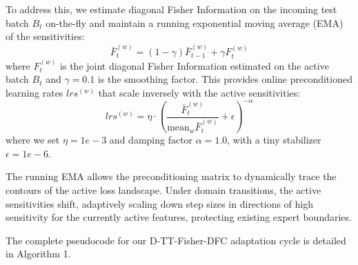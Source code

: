 \documentclass{article}
\theoremstyle{plain}
\theoremstyle{definition}
\theoremstyle{remark}
\begin{document}
To address this, we estimate diagonal Fisher Information on the incoming test batch $B_t$ on-the-fly and maintain a running exponential moving average (EMA) of the sensitivities:
\begin{equation}
  \bar{F}_t^{(w)} = (1 - \gamma) \bar{F}_{t-1}^{(w)} + \gamma F_t^{(w)}
\end{equation}
where $F_t^{(w)}$ is the joint diagonal Fisher Information estimated on the active batch $B_t$ and $\gamma = 0.1$ is the smoothing factor. This provides online preconditioned learning rates $lrs^{(w)}$ that scale inversely with the active sensitivities:
\begin{equation}
  lrs^{(w)} = \eta \cdot \left( \frac{\bar{F}_t^{(w)}}{\text{mean}_w \bar{F}_t^{(w)}} + \epsilon \right)^{-\alpha}
\end{equation}
where we set $\eta = 1e-3$ and damping factor $\alpha = 1.0$, with a tiny stabilizer $\epsilon = 1e-6$.

The running EMA allows the preconditioning matrix to dynamically trace the contours of the active loss landscape. Under domain transitions, the active sensitivities shift, adaptively scaling down step sizes in directions of high sensitivity for the currently active features, protecting existing expert boundaries.

The complete pseudocode for our D-TT-Fisher-DFC adaptation cycle is detailed in Algorithm 1.
\end{document}
